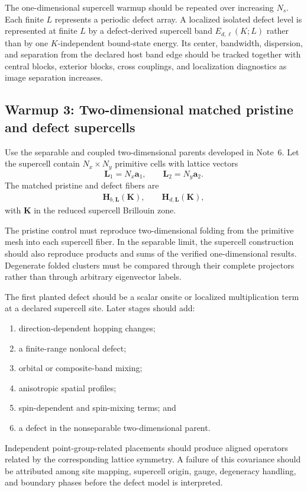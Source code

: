 The one-dimensional supercell warmup should be repeated over increasing
$N_s$. Each finite $L$ represents a periodic defect array. A localized isolated
defect level is represented at finite $L$ by a defect-derived supercell band
$E_{d,\ell}(K;L)$ rather than by one $K$-independent bound-state energy. Its
center, bandwidth, dispersion, and separation from the declared host band edge
should be tracked together with central blocks, exterior blocks, cross
couplings, and localization diagnostics as image separation increases.

\subsection*{Warmup 3: Two-dimensional matched pristine and defect supercells}

Use the separable and coupled two-dimensional parents developed in Note~6. Let
the supercell contain $N_x\times N_y$ primitive cells with lattice vectors
\begin{equation}
    \mathbf L_1=N_x\mathbf a_1,
    \qquad
    \mathbf L_2=N_y\mathbf a_2.
\end{equation}
The matched pristine and defect fibers are
\begin{align}
    \mathbf H_{b,\mathbf L}(\mathbf K),
    \qquad
    \mathbf H_{d,\mathbf L}(\mathbf K),
\end{align}
with $\mathbf K$ in the reduced supercell Brillouin zone.

The pristine control must reproduce two-dimensional folding from the primitive
mesh into each supercell fiber. In the separable limit, the supercell
construction should also reproduce products and sums of the verified
one-dimensional results. Degenerate folded clusters must be compared through
their complete projectors rather than through arbitrary eigenvector labels.

The first planted defect should be a scalar onsite or localized multiplication
term at a declared supercell site. Later stages should add:
\begin{enumerate}
    \item direction-dependent hopping changes;
    \item a finite-range nonlocal defect;
    \item orbital or composite-band mixing;
    \item anisotropic spatial profiles;
    \item spin-dependent and spin-mixing terms; and
    \item a defect in the nonseparable two-dimensional parent.
\end{enumerate}
Independent point-group-related placements should produce aligned operators
related by the corresponding lattice symmetry. A failure of this covariance
should be attributed among site mapping, supercell origin, gauge, degeneracy
handling, and boundary phases before the defect model is interpreted.

